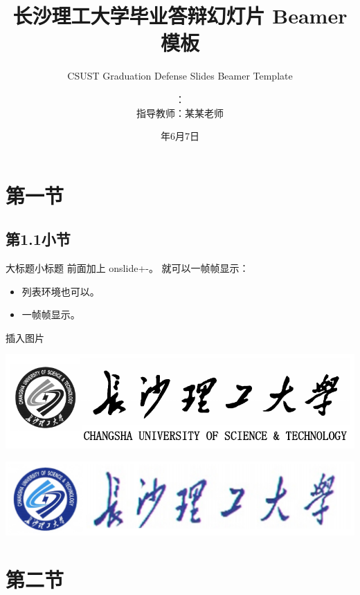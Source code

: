 \documentclass[dvipsnames, svgnames, x11names]{beamer}
\title{长沙理工大学毕业答辩幻灯片 Beamer 模板}
\subtitle{CSUST Graduation Defense Slides Beamer Template}
\author[你的名字]{\makebox[4em][s]{演讲人}：\makebox[4em][l]{你的名字}\\ 指导教师：某某老师}
\institute[长沙理工大学计算机与通信工程学院]{长沙理工大学计算机与通信工程学院\\ 软件工程18-x班}
\date{\the\year 年6月7日}
\begin{document}
\begin{frame}[plain]
    \titlepage
\end{frame}

\begin{frame}[plain]
    \tableofcontents[sectionstyle=show,subsectionstyle=show/shaded/hide,subsubsectionstyle=show/shaded/hide]
\end{frame}

\section{第一节}
\subsection{第1.1小节}
\begin{frame}{大标题}{小标题}
    \onslide<+-> 前面加上 onslide+-。
    \onslide<+-> 就可以一帧帧显示：
    \begin{itemize}[<+->]
        \item 列表环境也可以。
        \item 一帧帧显示。
    \end{itemize}
\end{frame}

\begin{frame}
    插入图片
    \begin{center}
        \includegraphics[scale=.5]{../figure/csust_logo_and_name.pdf}
    \end{center}
    \begin{center}
        \includegraphics[scale=.5]{../figure/csust_logo_and_name2.pdf}
    \end{center}
\end{frame}

\section{第二节}
\end{document}
